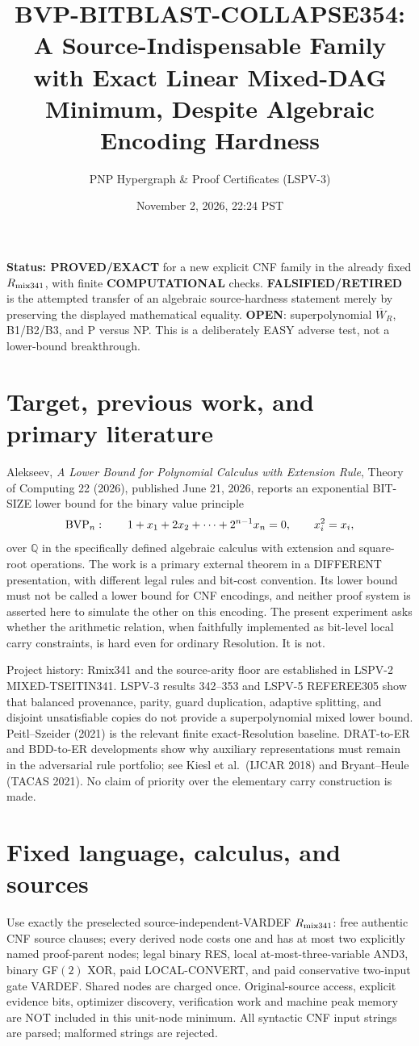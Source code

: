 \documentclass[11pt]{article}
\title{BVP-BITBLAST-COLLAPSE354: A Source-Indispensable Family with Exact Linear Mixed-DAG Minimum, Despite Algebraic Encoding Hardness}
\author{PNP Hypergraph \& Proof Certificates (LSPV-3)}
\date{November 2, 2026, 22:24 PST}
\begin{document}
\maketitle
\noindent\textbf{Status: PROVED/EXACT} for a new explicit CNF family in the already fixed $R_{\rm mix341}$, with finite \textbf{COMPUTATIONAL} checks. \textbf{FALSIFIED/RETIRED} is the attempted transfer of an algebraic source-hardness statement merely by preserving the displayed mathematical equality. \textbf{OPEN}: superpolynomial $\overline W_R$, B1/B2/B3, and P versus NP. This is a deliberately EASY adverse test, not a lower-bound breakthrough.

\section*{Target, previous work, and primary literature}
Alekseev, \emph{A Lower Bound for Polynomial Calculus with Extension Rule}, Theory of Computing 22 (2026), published June 21, 2026, reports an exponential BIT-SIZE lower bound for the binary value principle
\[
  {\rm BVP}_n:\qquad 1+x_1+2x_2+\cdots+2^{n-1}x_n=0,\qquad x_i^2=x_i,
\]
over $\mathbb Q$ in the specifically defined algebraic calculus with extension and square-root operations. The work is a primary external theorem in a DIFFERENT presentation, with different legal rules and bit-cost convention. Its lower bound must not be called a lower bound for CNF encodings, and neither proof system is asserted here to simulate the other on this encoding. The present experiment asks whether the arithmetic relation, when faithfully implemented as bit-level local carry constraints, is hard even for ordinary Resolution. It is not.

Project history: Rmix341 and the source-arity floor are established in LSPV-2 MIXED-TSEITIN341. LSPV-3 results 342--353 and LSPV-5 REFEREE305 show that balanced provenance, parity, guard duplication, adaptive splitting, and disjoint unsatisfiable copies do not provide a superpolynomial mixed lower bound. Peitl--Szeider (2021) is the relevant finite exact-Resolution baseline. DRAT-to-ER and BDD-to-ER developments show why auxiliary representations must remain in the adversarial rule portfolio; see Kiesl et al.\ (IJCAR 2018) and Bryant--Heule (TACAS 2021). No claim of priority over the elementary carry construction is made.

\section*{Fixed language, calculus, and sources}
Use exactly the preselected source-independent-VARDEF $R_{\rm mix341}$: free authentic CNF source clauses; every derived node costs one and has at most two explicitly named proof-parent nodes; legal binary RES, local at-most-three-variable AND3, binary GF$(2)$ XOR, paid LOCAL-CONVERT, and paid conservative two-input gate VARDEF. Shared nodes are charged once. Original-source access, explicit evidence bits, optimizer discovery, verification work and machine peak memory are NOT included in this unit-node minimum. All syntactic CNF input strings are parsed; malformed strings are rejected.
\end{document}
